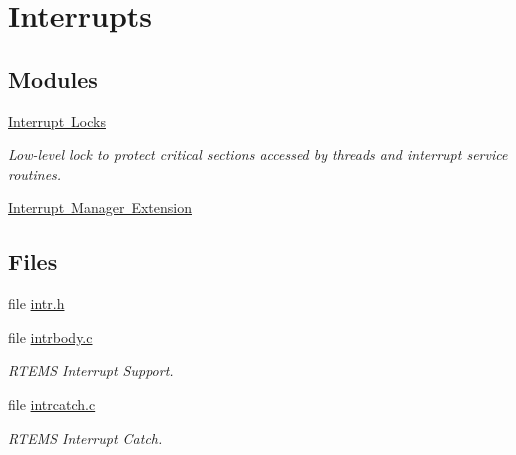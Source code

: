 \hypertarget{group__ClassicINTR}{}\section{Interrupts}
\label{group__ClassicINTR}
\subsection*{Modules}
\begin{DoxyCompactItemize}
\item 
\mbox{\hyperlink{group__ClassicINTRLocks}{Interrupt Locks}}
\begin{DoxyCompactList}\small\item\em Low-\/level lock to protect critical sections accessed by threads and interrupt service routines. \end{DoxyCompactList}\item 
\mbox{\hyperlink{group__rtems__interrupt__extension}{Interrupt Manager Extension}}
\end{DoxyCompactItemize}
\subsection*{Files}
\begin{DoxyCompactItemize}
\item 
file \mbox{\hyperlink{intr_8h}{intr.\+h}}
\item 
file \mbox{\hyperlink{intrbody_8c}{intrbody.\+c}}
\begin{DoxyCompactList}\small\item\em R\+T\+E\+MS Interrupt Support. \end{DoxyCompactList}\item 
file \mbox{\hyperlink{intrcatch_8c}{intrcatch.\+c}}
\begin{DoxyCompactList}\small\item\em R\+T\+E\+MS Interrupt Catch. \end{DoxyCompactList}\end{DoxyCompactItemize}
